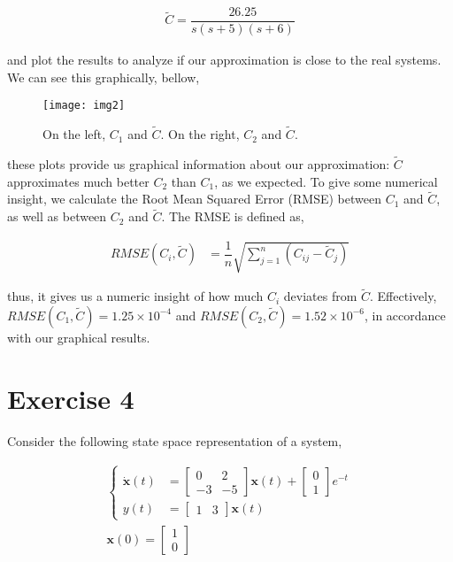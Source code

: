 \documentclass[12pt]{article}
\begin{document}
		\begin{align*}
			\tilde{C} = \dfrac{26.25}{s(s+5)(s+6)}
		\end{align*}
		
		and plot the results to analyze if our approximation is close to the real systems. We can see this graphically, bellow,
		
		\begin{figure}[H]
			\centering
			\texttt{[image: img2]}
			\caption{On the left, $C_{1}$ and $\tilde{C}$. On the right, $C_{2}$ and $\tilde{C}$.}
			\label{Figure 2}
		\end{figure}
	
		these plots provide us graphical information about our approximation: $\tilde{C}$ approximates much better $C_{2}$ than $C_{1}$, as we expected. To give some numerical insight, we calculate the Root Mean Squared Error (RMSE) between $C_{1}$ and $\tilde{C}$, as well as between $C_{2}$ and $\tilde{C}$. The RMSE is defined as,
		
		\begin{align*}
			RMSE(C_{i},\tilde{C}) &= \dfrac{1}{n}\sqrt{\sum_{j=1}^{n}(C_{ij}-\tilde{C}_{j})}
		\end{align*}
		
		thus, it gives us a numeric insight of how much $C_{i}$ deviates from $\tilde{C}$. Effectively, $RMSE(C_{1},\tilde{C}) = 1.25\times 10^{-4}$ and $RMSE(C_{2},\tilde{C}) = 1.52\times 10^{-6}$, in accordance with our graphical results.
	\section{Exercise 4}
		Consider the following state space representation of a system,
		
		\begin{align*}
			\begin{cases}
				\dot{\mathbf{x}}(t) &= \begin{bmatrix}
				0 & 2\\
				-3 & -5
				\end{bmatrix}\mathbf{x}(t) + \begin{bmatrix}
				0\\
				1
				\end{bmatrix}e^{-t}\\
				y(t) &= \begin{bmatrix}
					1 & 3
				\end{bmatrix}\mathbf{x}(t)
			\end{cases}\\
			\mathbf{x}(0) = \begin{bmatrix}
				1\\
				0
			\end{bmatrix}
		\end{align*}
			
\end{document}
